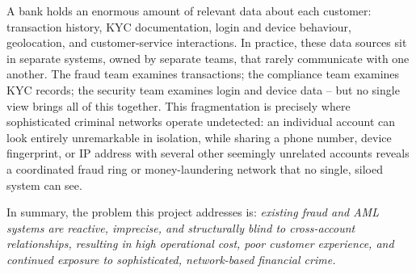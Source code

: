 A bank holds an enormous amount of relevant data about each customer: transaction history, KYC documentation, login and device behaviour, geolocation, and customer-service interactions. In practice, these data sources sit in separate systems, owned by separate teams, that rarely communicate with one another. The fraud team examines transactions; the compliance team examines KYC records; the security team examines login and device data -- but no single view brings all of this together. This fragmentation is precisely where sophisticated criminal networks operate undetected: an individual account can look entirely unremarkable in isolation, while sharing a phone number, device fingerprint, or IP address with several other seemingly unrelated accounts reveals a coordinated fraud ring or money-laundering network that no single, siloed system can see.

\vspace{0.3cm}
\noindent In summary, the problem this project addresses is: \textit{existing fraud and AML systems are reactive, imprecise, and structurally blind to cross-account relationships, resulting in high operational cost, poor customer experience, and continued exposure to sophisticated, network-based financial crime.}
